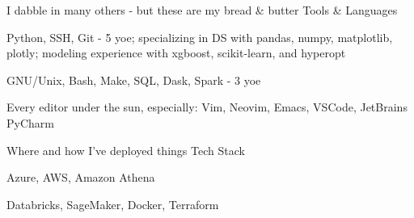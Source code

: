
\begin{cventries}
  \cventry
    {I dabble in many others - but these are my bread \& butter}
    {Tools \& Languages}
    {}
    {}
    {
      \begin{cvitems}
        \item {Python, SSH, Git - 5 yoe; specializing in DS with pandas, numpy, matplotlib, plotly; modeling experience with xgboost, scikit-learn, and hyperopt}
        \item {GNU/Unix, Bash, Make, SQL, Dask, Spark - 3 yoe}
        \item {Every editor under the sun, especially: Vim, Neovim, Emacs, VSCode, JetBrains PyCharm}
      \end{cvitems}
    }

  \cventry
    {Where and how I've deployed things}
    {Tech Stack}
    {}
    {}
    {
      \begin{cvitems}
        \item {Azure, AWS, Amazon Athena}
        \item {Databricks, SageMaker, Docker, Terraform}
      \end{cvitems}
    }

\end{cventries}